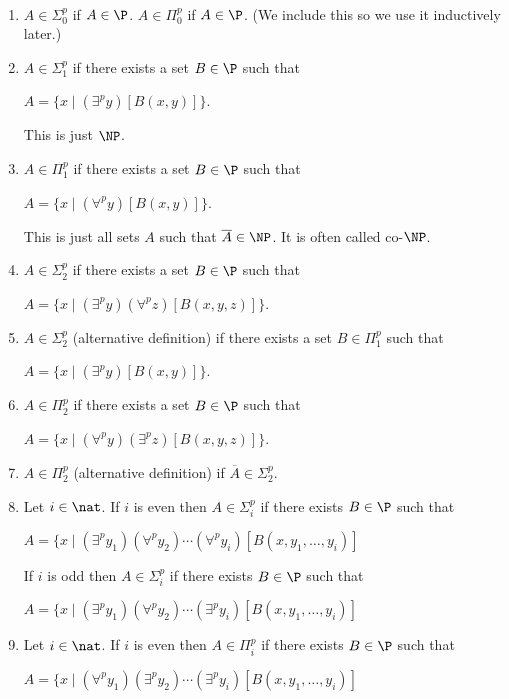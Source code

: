 \documentclass[12pt]{article}
\begin{document}
\begin{definition}~
\begin{enumerate}
\item
$A\in \Sigma_0^p$ if $A\in \P$.
$A\in \Pi_0^p$ if $A\in \P$.
(We include this so we use it inductively later.)
\item
$A\in \Sigma_1^p$ if there exists a set $B\in\P$ such that

$A=\{ x \mid (\exists^p y)[ B(x,y)] \}$.

This is just $\NP$.
\item
$A\in \Pi_1^p$ if there exists a set $B\in\P$ such that

$A=\{ x \mid (\forall^p y)[ B(x,y) ] \}$.

This is just all sets $A$ such that $\overline{A}\in \NP$.
It is often called co-$\NP$.

\item
$A\in \Sigma_2^p$ if there exists a set $B\in \P$ such that

$A=\{ x \mid (\exists^p y)(\forall^p z)[ B(x,y,z)] \}$.

\item
$A\in \Sigma_2^p$ (alternative definition) if there exists a set $B\in \Pi_1^p$ such that

$A=\{ x \mid (\exists^p y)[B(x,y)]\}$.

\item
$A\in \Pi_2^p$ if there exists a set $B\in \P$ such that

$A=\{ x \mid (\forall^p y)(\exists^p z)[ B(x,y,z)] \}$.

\item
$A\in \Pi_2^p$ (alternative definition) 
if $\overline{A}\in \Sigma_2^p$.

\item
Let $i\in\nat$. 
If $i$ is even then
$A\in \Sigma_i^p$ if there exists $B\in \P$ such that

$A= \{ x \mid (\exists^p y_1)(\forall^p y_2)\cdots(\forall^p y_i)[B(x,y_1,\ldots,y_i)]$

If $i$ is odd then
$A\in \Sigma_i^p$ if there exists $B\in \P$ such that

$A= \{ x \mid (\exists^p y_1)(\forall^p y_2)\cdots(\exists^p y_i)[B(x,y_1,\ldots,y_i)]$

\item
Let $i\in\nat$. 
If $i$ is even then
$A\in \Pi_i^p$ if there exists $B\in \P$ such that

$A= \{ x \mid (\forall^p y_1)(\exists^p y_2)\cdots(\exists^p y_i)[B(x,y_1,\ldots,y_i)]$


\end{enumerate}
\end{definition}
\end{document}
